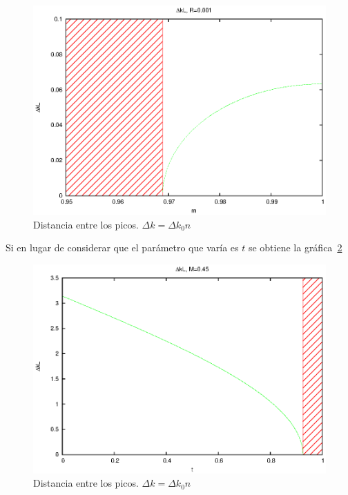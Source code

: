 \documentclass[oneside]{article}
\begin{document}
\begin{figure}[h]
    \centering
    \includegraphics{arcoseno.eps}
    \caption{Distancia entre los picos. $\Delta k=\Delta k_0 n$}
    \label{deltak_m}
\end{figure}

Si en lugar de considerar que el parámetro que varía es $t$ se obtiene la
gráfica~\ref{deltak_t}

\begin{figure}[h]
    \centering
    \includegraphics{deltak_t.eps}
    \caption{Distancia entre los picos. $\Delta k=\Delta k_0 n$ }
    \label{deltak_t}
\end{figure}
\end{document}
